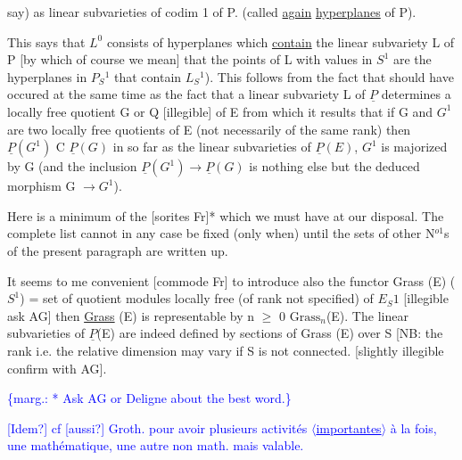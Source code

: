 \documentclass[11pt]{article}
\newcommand{\scanpage}[1]{\par\bigskip\noindent{\small\sffamily[scan #1]}\par}
\newcommand{\mspage}[1]{{\small\sffamily[p.\,#1]}}
\newcommand{\hand}[1]{\textcolor{blue}{#1}}
\newcommand{\inserted}[2][]{\textcolor{blue}{$\langle$#2$\rangle$}}
\newcommand{\margin}[1]{\textcolor{blue}{\{\textsf{marg.:} #1\}}}
\newcommand{\uline}[1]{\underline{#1}}
\newcommand{\unsure}[1]{[#1?]}
\begin{document}
\clearpage
\scanpage{24/74}
\mspage{74}

say) as linear subvarieties of codim 1 of P.  (called \uline{again}
\uline{hyperplanes} of P).

This says that $L^0$ consists of hyperplanes which \uline{contain} the
linear subvariety L of P [by which of course we mean] that the
points of L with values in $S^1$ are the hyperplanes in $P_S{}^1$ that
contain $L_S{}^1$).  This follows from the fact that should have occured
at the same time as the fact that a linear subvariety L of $\underline{P}$
determines a locally free quotient G or Q [illegible] of E from
which it results that if G and $G^1$ are two locally free quotients of
E (not necessarily of the same rank) then $\underline{P}(G^1)$ C $\underline{P}(G)$ in so far as
the linear subvarieties of $\underline{P}(E)$, $G^1$ is majorized by G (and the
inclusion $\underline{P}(G^1) \rightarrow \underline{P}(G)$ is nothing else but the deduced morphism G
$\rightarrow G^1$).

Here is a minimum of the [sorites Fr]* which we must have at
our disposal.  The complete list cannot in any case be fixed (only
when) until the sets of other N$^{o1}$s of the present paragraph are
written up.

It seems to me convenient [commode Fr] to introduce also the
functor Grass (E) ($S^1$) = set of quotient modules locally free (of
rank not specified) of $E_S1$ [illegible ask AG]
then \uline{Grass} (E) is representable by n $\geq$ 0 $\mathrm{Grass}_n$(E).  The linear
subvarieties of $\underline{P}$(E) are indeed defined by sections of Grass (E)
over S [NB:  the rank i.e. the relative dimension may vary if S is
not connected.  [slightly illegible confirm with AG].

\margin{* Ask AG or Deligne about the best word.}

\clearpage
\scanpage{24/75}
\hand{\unsure{Idem} cf \unsure{aussi} Groth. pour avoir plusieurs}
\hand{activités \inserted{\uline{importantes}} à la fois, une mathématique,}
\hand{une autre non math. mais valable.}
\end{document}
